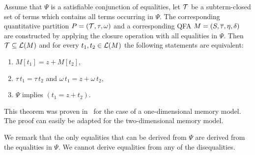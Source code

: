 \begin{theorem}
  Assume that $\Psi$ is a satisfiable conjunction of equalities, let $\mathcal{T}$ be a subterm-closed set of terms which contains all terms occurring in $\Psi$.
  The corresponding quantitative partition $P = (\mathcal{T}, \tau,\omega)$ and a corresponding QFA $M = (S, \overline{\tau}, \eta, \delta)$ are constructed by applying the closure operation with all equalities in $\Psi$.
  Then $\mathcal{T} \subseteq \mathcal{L}(M)$ and for every $t_1, t_2 \in \mathcal{L}(M)$ the following statements are equivalent:
  \begin{enumerate}
    \item $M[t_1] = z + M[t_2]$,
    \item $\tau\,t_1 = \tau\,t_2$ and $\omega\,t_1 = z + \omega\,t_2$,
    \item $\Psi$ implies $(t_1 = z + t_2)$.
  \end{enumerate}
\end{theorem}

This theorem was proven in~\cite{2pointer} for the case of a one-dimensional memory model.
The proof can easily be adapted for the two-dimensional memory model.

We remark that the only equalities that can be derived from $\Psi$ are derived from the equalities in $\Psi$. We cannot derive equalities from any of the disequalities.
